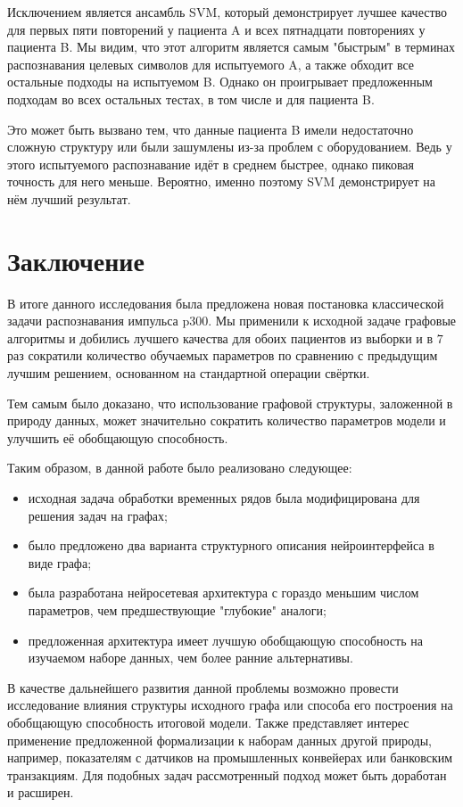 \documentclass[12pt]{article}
\begin{document}
Исключением является ансамбль SVM, который демонстрирует лучшее качество для первых пяти повторений у пациента A и всех пятнадцати повторениях у пациента B. Мы видим, что этот алгоритм является самым "быстрым" в терминах распознавания целевых символов для испытуемого A, а также обходит все остальные подходы на испытуемом B. Однако он проигрывает предложенным подходам во всех остальных тестах, в том числе и для пациента B.

Это может быть вызвано тем, что данные пациента B имели недостаточно сложную структуру или были зашумлены из-за проблем с оборудованием. Ведь у этого испытуемого распознавание идёт в среднем быстрее, однако пиковая точность для него меньше. Вероятно, именно поэтому SVM демонстрирует на нём лучший результат.

\section{Заключение}

В итоге данного исследования была предложена новая постановка классической задачи распознавания импульса p300. Мы применили к исходной задаче графовые алгоритмы и добились лучшего качества для обоих пациентов из выборки и в $7$ раз сократили количество обучаемых параметров по сравнению с предыдущим лучшим решением, основанном на стандартной операции свёртки. 

Тем самым было доказано, что использование графовой структуры, заложенной в природу данных, может значительно сократить количество параметров модели и улучшить её обобщающую способность.

Таким образом, в данной работе было реализовано следующее:
\begin{itemize}
    \item исходная задача обработки временных рядов была модифицирована для решения задач на графах;
    \item было предложено два варианта структурного описания нейроинтерфейса в виде графа;
    \item была разработана нейросетевая архитектура с гораздо меньшим числом параметров, чем предшествующие "глубокие" аналоги;
    \item предложенная архитектура имеет лучшую обобщающую способность на изучаемом наборе данных, чем более ранние альтернативы.
\end{itemize}

В качестве дальнейшего развития данной проблемы возможно провести исследование влияния структуры исходного графа или способа его построения на обобщающую способность итоговой модели. Также представляет интерес применение предложенной формализации к наборам данных другой природы, например, показателям с датчиков на промышленных конвейерах или банковским транзакциям. Для подобных задач рассмотренный подход может быть доработан и расширен.

\newpage
    
    
\end{document}
